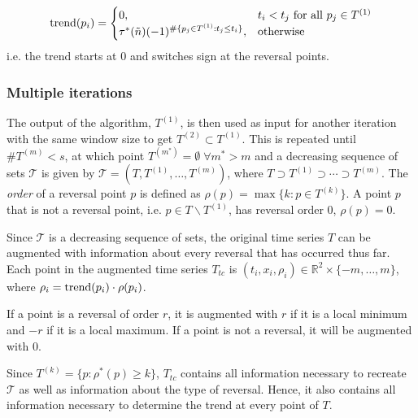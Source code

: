 \documentclass[../trend-calculus.tex]{subfiles}
\begin{document}
  \begin{equation*}
    \mathrm{trend}(p_i) = \begin{cases}
      0, & t_i < t_j \text{ for all } p_j \in T^{(1)} \\
      \tau^*(\tilde n) (-1)^{\#\{p_j \in T^{(1)} : t_j \le t_i\}}, & \text{otherwise}
    \end{cases}
  \end{equation*}
  i.e. the trend starts at 0 and switches sign at the reversal points.

  \subsubsection{Multiple iterations}

  The output of the algorithm, $T^{(1)}$,
  is then used as input for another iteration with 
  the same window size to get $T^{(2)} \subset T^{(1)}$.
  This is repeated until $\#T^{(m)} < s$, 
  at which point $T^{(m^*)} = \emptyset \; \forall m^* > m$ and 
  a decreasing sequence of sets $\mathcal{T}$ is given by
  $\mathcal{T} = (T, T^{(1)}, \dots, T^{(m)})$, where 
  $T \supset T^{(1)} \supset \cdots \supset T^{(m)}$.
  The \textit{order} of a reversal point $p$ is defined as 
  $\rho(p) = \max \{ k : p \in T^{(k)} \}$.
  A point $p$ that is not a reversal point, 
  i.e. $p \in T \backslash T^{(1)}$, 
  has reversal order 0, $\rho(p) = 0$.

  Since $\mathcal{T}$ is a decreasing sequence of sets, 
  the original time series $T$ can be augmented with 
  information about every reversal that has occurred thus far.
  Each point in the augmented time series $T_{tc}$ is 
  $(t_i,x_i,\rho_i) \in \mathbb{R}^2 \times \{ -m,\dots,m \}$, where 
  $\rho_i = \mathrm{trend}(p_i) \cdot \rho(p_i)$.

  If a point is a reversal of order $r$, 
  it is augmented with $r$ if it is 
  a local minimum and $-r$ if it is a local maximum. 
  If a point is not a reversal, it will be augmented with 0.

  Since $T^{(k)} = \{ p : \rho^*(p) \ge k \} $, 
  $T_{tc}$ contains all information necessary to recreate $\mathcal{T}$
  as well as information about the type of reversal.
  Hence, it also contains all information necessary to 
  determine the trend at every point of $T$.
\end{document}
